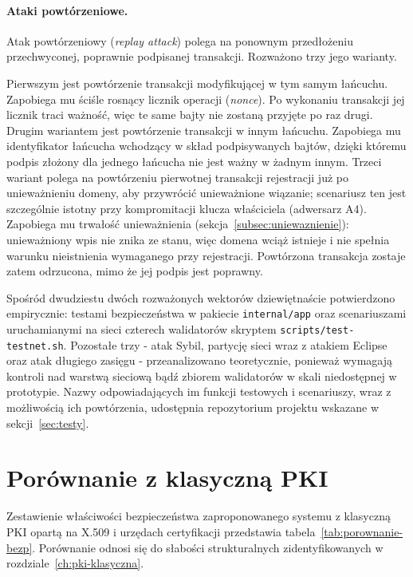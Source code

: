 \paragraph{Ataki powtórzeniowe.} Atak powtórzeniowy (\emph{replay attack}) polega na ponownym przedłożeniu przechwyconej, poprawnie podpisanej transakcji. Rozważono trzy jego warianty.

Pierwszym jest powtórzenie transakcji modyfikującej w tym samym łańcuchu. Zapobiega mu ściśle rosnący licznik operacji (\emph{nonce}). Po wykonaniu transakcji jej licznik traci ważność, więc te same bajty nie zostaną przyjęte po raz drugi. Drugim wariantem jest powtórzenie transakcji w innym łańcuchu. Zapobiega mu identyfikator łańcucha wchodzący w skład podpisywanych bajtów, dzięki któremu podpis złożony dla jednego łańcucha nie jest ważny w żadnym innym. Trzeci wariant polega na powtórzeniu pierwotnej transakcji rejestracji już po unieważnieniu domeny, aby przywrócić unieważnione wiązanie; scenariusz ten jest szczególnie istotny przy kompromitacji klucza właściciela (adwersarz A4). Zapobiega mu trwałość unieważnienia (sekcja~\ref{subsec:uniewaznienie}): unieważniony wpis nie znika ze stanu, więc domena wciąż istnieje i nie spełnia warunku nieistnienia wymaganego przy rejestracji. Powtórzona transakcja zostaje zatem odrzucona, mimo że jej podpis jest poprawny.

Spośród dwudziestu dwóch rozważonych wektorów dziewiętnaście potwierdzono empirycznie: testami bezpieczeństwa w pakiecie \texttt{internal/app} oraz scenariuszami uruchamianymi na sieci czterech walidatorów skryptem \texttt{scripts/test-testnet.sh}. Pozostałe trzy - atak Sybil, partycję sieci wraz z atakiem Eclipse oraz atak długiego zasięgu - przeanalizowano teoretycznie, ponieważ wymagają kontroli nad warstwą sieciową bądź zbiorem walidatorów w skali niedostępnej w prototypie. Nazwy odpowiadających im funkcji testowych i scenariuszy, wraz z możliwością ich powtórzenia, udostępnia repozytorium projektu wskazane w sekcji~\ref{sec:testy}.

\section{Porównanie z klasyczną PKI}
\label{sec:porownanie-bezpieczenstwa}

Zestawienie właściwości bezpieczeństwa zaproponowanego systemu z klasyczną PKI opartą na X.509 i urzędach certyfikacji przedstawia tabela~\ref{tab:porownanie-bezp}. Porównanie odnosi się do słabości strukturalnych zidentyfikowanych w rozdziale~\ref{ch:pki-klasyczna}.

